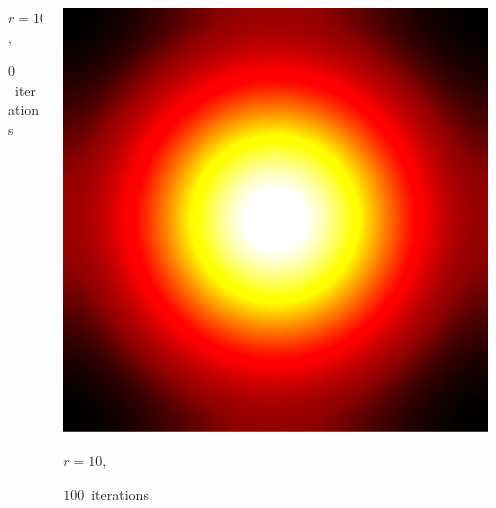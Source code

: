 \documentclass[aspectratio=169,t]{beamer}
\begin{document}
{\begin{columns}
\begin{column}{0.22\textwidth}
			{\footnotesize
				\par \vspace{-1mm} $r=10$,
				\par \vspace{-1mm} $0$~iterations
			}
		\end{column}
		\begin{column}{0.22\textwidth}
			\centering
			\includegraphics[width=.85\textwidth]{data/synthetic_meshes/square_tesselation_4tri_Dirac_delta_10_v841_f1600_funcvals_100iter.png}
			{\footnotesize
				\par \vspace{-1mm} $r=10$,
				\par \vspace{-1mm} $100$~iterations
			}
		\end{column}
		\begin{column}{0.17\textwidth}~\end{column}
	\end{columns}
}
\end{document}
